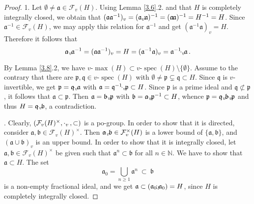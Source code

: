 \documentclass[a4paper]{amsart}
\theoremstyle{definition}
\numberwithin{equation}{section}
\begin{document}
\begin{proof}
1. Let $\emptyset \ne \mathfrak a \in \mathcal F_v (H)$. Using Lemma
\ref{3.6}.2. and that $H$ is completely integrally closed, we obtain
that $(\mathfrak a \mathfrak a^{-1})_v = (\mathfrak a_v {\negthinspace : \negthinspace}
\mathfrak a)^{-1} = ( \mathfrak a {\negthinspace : \negthinspace} \mathfrak a)^{-1} = H^{-1} =
H$. Since $\mathfrak a^{-1} \in \mathcal F_v (H)$, we may apply this
relation for $\mathfrak a^{-1}$ and get $(\mathfrak a^{-1} \mathfrak
a)_v = H$. Therefore it follows that
\[
\mathfrak a {\negthinspace \cdot_v \negthinspace} \mathfrak a^{-1} = (\mathfrak a \mathfrak a^{-1})_v
=  H  = (\mathfrak a^{-1} \mathfrak a)_v = \mathfrak a^{-1} {\negthinspace \cdot_v \negthinspace}
\mathfrak a \,.
\]

By Lemma \ref{3.8}.2, we have $v$-$\max (H) \subset v$-$\operatorname{spec} (H)
\setminus \{\emptyset\}$. Assume to the contrary that there are
$\mathfrak p, \mathfrak q \in v$-$\operatorname{spec} (H)$ with $\emptyset \ne
\mathfrak p \subsetneq \mathfrak q \subset H$. Since $\mathfrak q$
is $v$-invertible, we get $\mathfrak p = \mathfrak q {\negthinspace \cdot_v \negthinspace} \mathfrak
a$ with $\mathfrak a = \mathfrak q^{-1} {\negthinspace \cdot_v \negthinspace} \mathfrak p \subset H$.
Since $\mathfrak p$ is a prime ideal and $\mathfrak q \not\subset
\mathfrak p$, it follows that $\mathfrak a \subset \mathfrak p$.
Then $\mathfrak a = \mathfrak b {\negthinspace \cdot_v \negthinspace} \mathfrak p$ with $\mathfrak b
= \mathfrak a {\negthinspace \cdot_v \negthinspace} \mathfrak p^{-1} \subset H$, whence $\mathfrak p
= \mathfrak q {\negthinspace \cdot_v \negthinspace} \mathfrak b {\negthinspace \cdot_v \negthinspace} \mathfrak p$ and thus $H =
\mathfrak q {\negthinspace \cdot_v \negthinspace} \mathfrak b$, a contradiction.

. Clearly, $(\mathcal F_v(H)^{\times}, \, {\negthinspace \cdot_v \negthinspace} \ , \subset)$ is a
po-group. In order to show that it is directed, consider $\mathfrak
a, \mathfrak b \in \mathcal F_v (H)^{\times}$. Then $\mathfrak a
{\negthinspace \cdot_v \negthinspace} \mathfrak b \in \mathcal F_v^{\times} (H)$ is a lower bound of
$\{\mathfrak a, \mathfrak b\}$, and $(\mathfrak a \cup \mathfrak
b)_v$ is an upper bound. In order to show that it is integrally
closed, let $\mathfrak a, \mathfrak b \in \mathcal F_v (H)^{\times}$
be given such that $\mathfrak a^n \subset \mathfrak b$ for all $n
\in \mathbb N$. We have to show that $\mathfrak a \subset H$. The
set
\[
\mathfrak a_0 = \bigcup_{n \ge 1} \mathfrak a^n \ \subset \ \mathfrak b
\]
is a non-empty fractional ideal, and we get $\mathfrak a \subset (
\mathfrak a_0 {\negthinspace :_l \negthinspace} \mathfrak a_0) = H$, since $H$ is completely
integrally closed.


\end{proof}
\end{document}
